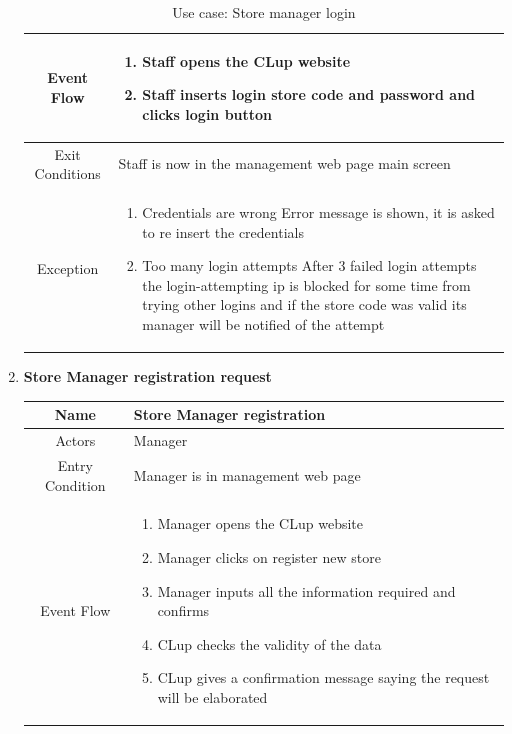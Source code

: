 \begin{enumerate}
\begin{table}[H]
{\begin{tabular}{|c|p{14cm}|}
			Event Flow & \begin{enumerate}
				\item Staff opens the CLup website
				\item Staff inserts login store code and password and clicks login button
				
			\end{enumerate}\\
			
			\hline
			Exit Conditions & Staff is now in the management web page main screen\\
			\hline
			
			Exception & \begin{enumerate}
				\item Credentials are wrong\newline
				Error message is shown, it is asked to re insert the credentials
				\item Too many login attempts\newline
				After 3 failed login attempts the login-attempting ip is blocked for some time from trying other logins and if the store code was valid its manager will be notified of the attempt
				
			\end{enumerate}\\
			
			\hline
		\end{tabular}
	}
	\label{tab:UCManLog}
	\caption{Use case: Store manager login}
\end{table}

\item \textbf{Store Manager registration request}

\begin{table}[H]
	{
		\begin{tabular}{|c|p{14cm}|}
			\hline
			Name & Store Manager registration\\
			\hline
			Actors & Manager\\
			\hline
			Entry Condition & Manager is in management web page\\
			\hline
			
			Event Flow & \begin{enumerate}
				\item Manager opens the CLup website
				\item Manager clicks on register new store
				\item Manager inputs all the information required and confirms
				\item CLup checks the validity of the data
				\item CLup gives a confirmation message saying the request will be elaborated
				

\end{enumerate}
\end{tabular}}
\end{table}
\end{enumerate}
